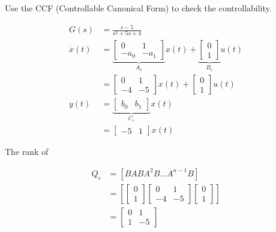 \documentclass[main.tex]{subfiles}
\begin{document}
\begin{enumerate}
\begin{enumerate}
    Use the CCF (Controllable Canonical Form) to check the controllability. 
    
    $$
    \begin{aligned}
    G(s) &= \frac{s-5}{s^2+5s+4}\\
    \dot{x}(t) & =\underbrace{\left[\begin{array}{ccc}
    0 & 1 \\
    -a_0 & -a_1
    \end{array}\right]}_{A_c}x(t)+\underbrace{\left[\begin{array}{l}
    0 \\
    1
    \end{array}\right]}_{B_c} u(t) \\
    & =\left[\begin{array}{cc}
    0 & 1 \\
    -4 & -5
    \end{array}\right]x(t)+\left[\begin{array}{l}
    0 \\
    1
    \end{array}\right] u(t) \\
    y(t) & =\underbrace{\left[\begin{array}{ll}
    b_0 & b_1
    \end{array}\right]}_{C_c}x(t)\\
    & =\left[\begin{array}{ll}
    -5 & 1
    \end{array}\right]x(t)
    \end{aligned}
    $$
    
    The rank of
    
    $$
    \begin{aligned}  
    Q_c &= \left[B A B A^2 B \ldots A^{n-1} B\right]\\
    &= \left[\left[\begin{array}{l}
    0 \\
    1
    \end{array}\right] \left[\begin{array}{cc}
    0 & 1 \\
    -4 & -5
    \end{array}\right] \left[\begin{array}{l}
    0 \\
    1
    \end{array}\right] \right]\\
    & = \left[\begin{array}{cc}
    0 & 1 \\
    1 & -5
    \end{array}\right]
    \end{aligned}
    $$
    

\end{enumerate}
\end{enumerate}
\end{document}
